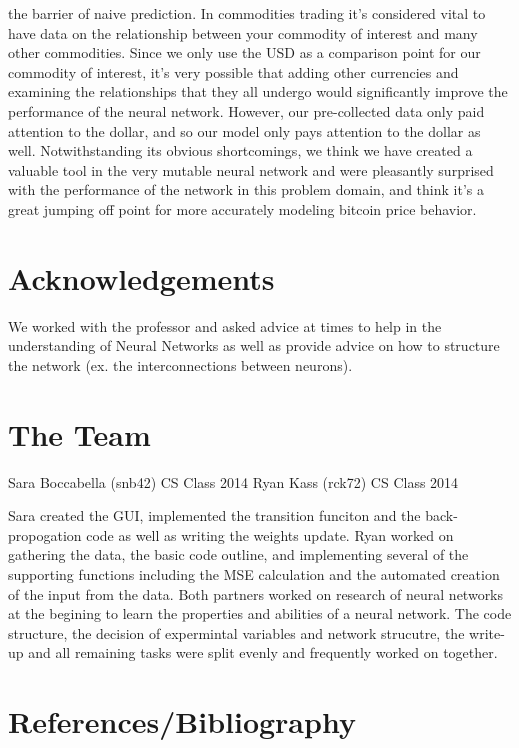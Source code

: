 \documentclass[a4paper,11pt]{article}
\begin{document}
the barrier of naive prediction.
\newline \newline
In commodities trading it's considered vital to have data on the relationship between your commodity of interest and many other
commodities.  Since we only use the USD as a comparison point for our commodity of interest, it's very possible that adding other
currencies and examining the relationships that they all undergo would significantly improve the performance of the neural 
network.  However, our pre-collected data only paid attention to the dollar, and so our model only pays attention to the dollar
as well.  Notwithstanding its obvious shortcomings, we think we have created a valuable tool in the very mutable neural network and
were pleasantly surprised with the performance of the network in this problem domain, and think it's a great jumping off
point for more accurately modeling bitcoin price behavior.


\section{Acknowledgements}

We worked with the professor and asked advice at times to help in the understanding of Neural Networks as well as provide advice on how to structure the network (ex. the interconnections between neurons). 

\section{The Team}
Sara Boccabella (snb42) CS Class 2014
Ryan Kass (rck72) CS Class 2014

Sara created the GUI, implemented the transition funciton and the back-propogation code as well as writing the weights update. 
Ryan worked on gathering the data, the basic code outline, and implementing several of the supporting functions including the MSE calculation and the automated creation of the input from the data.
Both partners worked on research of neural networks at the begining to learn the properties and abilities of a neural network. The code structure, the decision of expermintal variables and network strucutre, the write-up and all remaining tasks were split evenly and frequently worked on together. 



\section{References/Bibliography}
\end{document}
